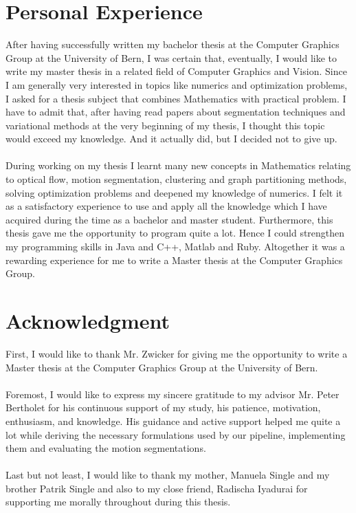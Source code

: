 \section{Personal Experience}
After having successfully written my bachelor thesis at the Computer Graphics Group at the University of Bern, I was certain that, eventually, I would like to write my master thesis in a related field of Computer Graphics and Vision. Since I am generally very interested in topics like numerics and optimization problems, I asked for a thesis subject that combines Mathematics with practical problem. I have to admit that, after having read papers about segmentation techniques and variational methods at the very beginning of my thesis, I thought this topic would exceed my knowledge. And it actually did, but I decided not to give up. \\ \\
During working on my thesis I learnt many new concepts in Mathematics relating to optical flow, motion segmentation, clustering and graph partitioning methods, solving optimization problems and deepened my knowledge of numerics. I felt it as a satisfactory experience to use and apply all the knowledge which I have acquired during the time as a bachelor and master student. Furthermore, this thesis gave me the opportunity to program quite a lot. Hence I could strengthen my programming skills in Java and C++, Matlab and Ruby. Altogether it was a rewarding experience for me to write a Master thesis at the Computer Graphics Group.
\section{Acknowledgment}
First, I would like to thank Mr. Zwicker for giving me the opportunity to write a Master thesis at the Computer Graphics Group at the University of Bern. \\ \\
Foremost, I would like to express my sincere gratitude to my advisor Mr. Peter Bertholet for his continuous support of my study, his patience, motivation, enthusiasm, and knowledge. His guidance and active support helped me quite a lot while deriving the necessary formulations used by our pipeline, implementing them and evaluating the motion segmentations. \\ \\
Last but not least, I would like to thank my mother, Manuela Single and my brother Patrik Single and also to my close friend, Radischa Iyadurai for supporting me morally throughout during this thesis.